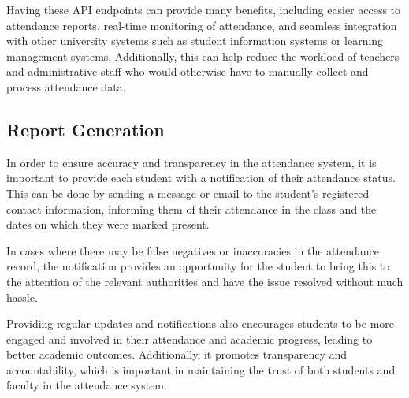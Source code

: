 Having these API endpoints can provide many benefits, including easier access to attendance reports, real-time monitoring of attendance, and seamless integration with other university systems such as student information systems or learning management systems. Additionally, this can help reduce the workload of teachers and administrative staff who would otherwise have to manually collect and process attendance data.

\subsection{Report Generation}
In order to ensure accuracy and transparency in the attendance system, it is important to provide each student with a notification of their attendance status. This can be done by sending a message or email to the student's registered contact information, informing them of their attendance in the class and the dates on which they were marked present.

In cases where there may be false negatives or inaccuracies in the attendance record, the notification provides an opportunity for the student to bring this to the attention of the relevant authorities and have the issue resolved without much hassle.

Providing regular updates and notifications also encourages students to be more engaged and involved in their attendance and academic progress, leading to better academic outcomes. Additionally, it promotes transparency and accountability, which is important in maintaining the trust of both students and faculty in the attendance system.